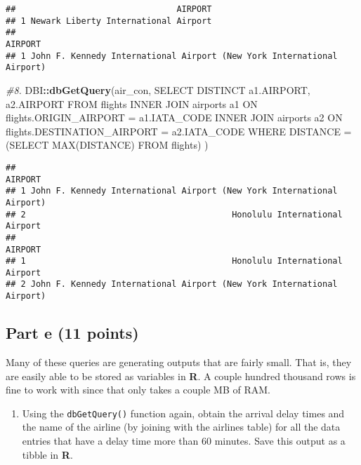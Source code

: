 \documentclass[
]{article}
\newenvironment{Shaded}{\begin{snugshade}}{\end{snugshade}}
\newcommand{\CommentTok}[1]{\textcolor[rgb]{0.56,0.35,0.01}{\textit{#1}}}
\newcommand{\FunctionTok}[1]{\textcolor[rgb]{0.13,0.29,0.53}{\textbf{#1}}}
\newcommand{\NormalTok}[1]{#1}
\newcommand{\SpecialCharTok}[1]{\textcolor[rgb]{0.81,0.36,0.00}{\textbf{#1}}}
\newcommand{\StringTok}[1]{\textcolor[rgb]{0.31,0.60,0.02}{#1}}
\providecommand{\tightlist}{%
  \setlength{\itemsep}{0pt}\setlength{\parskip}{0pt}}
\begin{document}
\begin{verbatim}
##                                AIRPORT
## 1 Newark Liberty International Airport
##                                                                  AIRPORT
## 1 John F. Kennedy International Airport (New York International Airport)
\end{verbatim}

\begin{Shaded}
\begin{Highlighting}[]
\CommentTok{\#8.}
\NormalTok{DBI}\SpecialCharTok{::}\FunctionTok{dbGetQuery}\NormalTok{(air\_con, }\StringTok{\textquotesingle{}SELECT DISTINCT a1.AIRPORT, a2.AIRPORT}
\StringTok{                  FROM flights }
\StringTok{                  INNER JOIN airports a1}
\StringTok{                  ON  flights.ORIGIN\_AIRPORT = a1.IATA\_CODE  }
\StringTok{                  INNER JOIN airports a2}
\StringTok{                  ON  flights.DESTINATION\_AIRPORT = a2.IATA\_CODE}
\StringTok{                  WHERE DISTANCE = (SELECT MAX(DISTANCE) FROM flights)\textquotesingle{}}
\NormalTok{)}
\end{Highlighting}
\end{Shaded}

\begin{verbatim}
##                                                                  AIRPORT
## 1 John F. Kennedy International Airport (New York International Airport)
## 2                                         Honolulu International Airport
##                                                                  AIRPORT
## 1                                         Honolulu International Airport
## 2 John F. Kennedy International Airport (New York International Airport)
\end{verbatim}

\hypertarget{part-e-11-points}{%
\subsection{Part e (11 points)}\label{part-e-11-points}}

Many of these queries are generating outputs that are fairly small. That
is, they are easily able to be stored as variables in \textbf{R}. A
couple hundred thousand rows is fine to work with since that only takes
a couple MB of RAM.

\begin{enumerate}
\def\labelenumi{\arabic{enumi}.}
\tightlist
\item
  Using the \texttt{dbGetQuery()} function again, obtain the arrival
  delay times and the name of the airline (by joining with the airlines
  table) for all the data entries that have a delay time more than 60
  minutes. Save this output as a tibble in \textbf{R}.
\end{enumerate}
\end{document}
